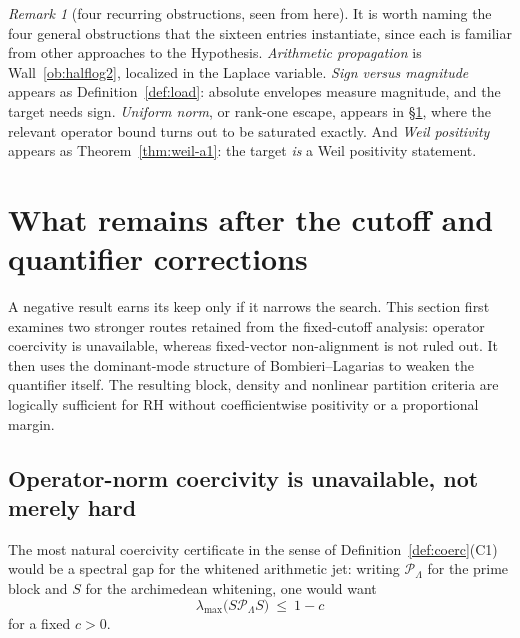 \documentclass[11pt]{amsart}
\theoremstyle{definition}
\theoremstyle{remark}
\newtheorem{remark}[theorem]{Remark}
\theoremstyle{definition}
\begin{document}
\begin{remark}[four recurring obstructions, seen from here]\label{rmk:walls}
It is worth naming the four general obstructions that the sixteen entries instantiate, since each is
familiar from other approaches to the Hypothesis. \emph{Arithmetic propagation} is
Wall~\ref{ob:halflog2}, localized in the Laplace variable. \emph{Sign versus magnitude} appears as
Definition~\ref{def:load}: absolute envelopes measure magnitude, and the target needs sign.
\emph{Uniform norm}, or rank-one escape, appears in \S\ref{sec:successor}, where the relevant
operator bound turns out to be saturated exactly. And \emph{Weil positivity} appears as
Theorem~\ref{thm:weil-a1}: the target \emph{is} a Weil positivity statement.
\end{remark}

\section{What remains after the cutoff and quantifier corrections}\label{sec:successor}

A negative result earns its keep only if it narrows the search. This section first examines two
stronger routes retained from the fixed-cutoff analysis: operator coercivity is unavailable,
whereas fixed-vector non-alignment is not ruled out. It then uses the dominant-mode structure of
Bombieri--Lagarias to weaken the quantifier itself. The resulting block, density and nonlinear
partition criteria are logically sufficient for RH without coefficientwise positivity or a
proportional margin.

\subsection{Operator-norm coercivity is unavailable, not merely hard}\label{sec:no-operator-gap}

The most natural coercivity certificate in the sense of Definition~\ref{def:coerc}(C1) would be a
spectral gap for the whitened arithmetic jet: writing $\mathcal P_\Lambda$ for the prime block and
$S$ for the archimedean whitening, one would want
\begin{equation}\label{eq:gap-false}
   \lambda_{\max}\bigl(S\mathcal P_\Lambda S\bigr)\ \le\ 1-c
\end{equation}
for a fixed $c>0$.
\end{document}

